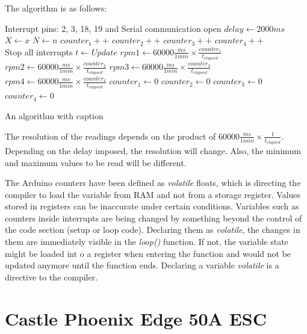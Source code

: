 \documentclass[a4paper]{article}
\begin{document}
The algorithm is as follows:

\begin{algorithm}
	\begin{algorithmic}
		\Ensure Interrupt pins: 2, 3, 18, 19 and Serial communication open
		\State $delay \gets 2000ms$
		\State $X \gets x$
		\State $N \gets n$
		\State $counter_1  ++ $
		\State $counter_2  ++ $  
		\State $counter_3  ++ $
		\State $counter_4  ++ $
		\EndFor
		\\Stop all interrupts 
		\State $t \gets Update  $
		\State $rpm1 \gets 60000\frac{ms}{1min} \times \frac{counter_1}{t_{elapsed}} $
		\State $rpm2 \gets 60000\frac{ms}{1min} \times \frac{counter_2}{t_{elapsed}} $
		\State $rpm3 \gets 60000\frac{ms}{1min} \times \frac{counter_3}{t_{elapsed}} $
		\State $rpm4 \gets 60000\frac{ms}{1min} \times \frac{counter_4}{t_{elapsed}} $
		\State $counter_1  \gets 0 $
		\State $counter_2  \gets 0$  
		\State $counter_3  \gets 0 $
		\State $counter_4  \gets 0 $
		\EndWhile
	\end{algorithmic}
\caption{An algorithm with caption}
\label{alg:cap}
\end{algorithm}

The resolution of the readings depends on the product of $60000\frac{ms}{1min} \times \frac{1}{t_{elapsed}}$. Depending on the delay imposed, the resolution will change. Also, the minimum and maximum values to be read will be different.


The Arduino counters have been defined as \textit{volatile}\cite{volatiles} floats, which is directing the compiler to load the variable from RAM and not from a storage register. Values stored in registers can be inaccurate under certain conditions. Variables such as counters inside interrupts are being changed by something beyond the control of the code section (setup or loop code). Declaring them as \textit{volatile}, the changes in them are immediately visible in the \textit{loop()} function. If not, the variable state might be loaded int o a register when entering the function and would not be updated anymore until the function ends. 
Declaring a variable \textit{volatile} is a directive to the compiler.


\section{Castle Phoenix Edge 50A ESC}
\end{document}
